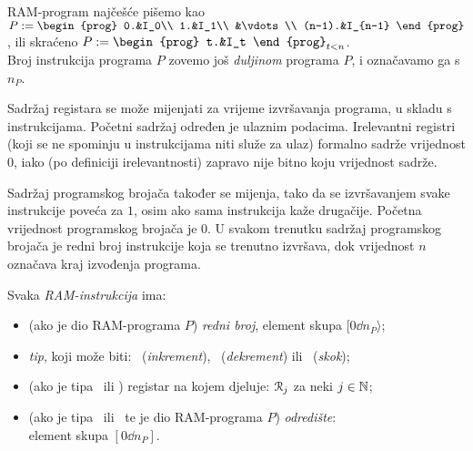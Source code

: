 RAM-program najčešće pišemo kao %
$P:=\begin{prog}
    0.&I_0\\
    1.&I_1\\
    &\vdots\\
    (n-1).&I_{n-1}
    \end{prog}$, ili skraćeno $P:=\begin{prog}
    t.&I_t
    \end{prog}_{t<n}$.\\
Broj instrukcija programa $P$ zovemo još \emph{duljinom} programa $P$, i označavamo ga s $n_P$.

Sadržaj registara se može mijenjati za vrijeme izvršavanja programa, u skladu s instrukcijama. Početni sadržaj određen je ulaznim podacima. Irelevantni registri (koji se ne spominju u instrukcijama niti služe za ulaz) formalno sadrže vrijednost $0$, iako (po definiciji irelevantnosti) zapravo nije bitno koju vrijednost sadrže.

Sadržaj programskog brojača također se mijenja, tako da se iz\-vr\-ša\-va\-njem svake instrukcije poveća za $1$, osim ako sama instrukcija kaže drugačije. Početna vrijednost programskog brojača je $0$. U svakom trenutku sadržaj programskog brojača je redni broj instrukcije koja se trenutno izvršava, dok vrijednost $n$ označava kraj izvođenja programa.

\begin{definicija}[{name=[RAM-instrukcija]}]\label{def:ins}
Svaka \emph{RAM-instrukcija} ima:
\begin{itemize}
    \item (ako je dio RAM-programa $P$) \emph{redni broj}, element skupa $[0\dd n_P\rangle$;
    \item \emph{tip}, koji može biti: \inc\ (\hspace{-1pt}\emph{inkrement}\/), \dec\ (\hspace{-1pt}\emph{dekrement}\/) ili \goto\ (\hspace{-1pt}\emph{skok}\/);
    \item (ako je tipa \inc\ ili \dec) registar na kojem djeluje: $\mathcal R_{j}$ za neki $j\in{\mathbb N}$;
    \item (ako je tipa \dec\ ili \goto\ te je dio RAM-programa $P$) \emph{odredište}: \\ element skupa $[0\dd n_P]$.
    \qedhere
\end{itemize}
\end{definicija}

